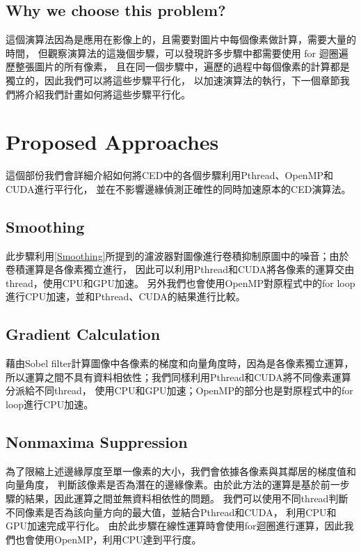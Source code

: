 \documentclass[sigconf,nonacm]{acmart}
\begin{document}
\subsection{Why we choose this problem?}

這個演算法因為是應用在影像上的，且需要對圖片中每個像素做計算，需要大量的時間，
但觀察演算法的這幾個步驟，可以發現許多步驟中都需要使用 for 迴圈遍歷整張圖片的所有像素，
且在同一個步驟中，遍歷的過程中每個像素的計算都是獨立的，因此我們可以將這些步驟平行化，
以加速演算法的執行，下一個章節我們將介紹我們計畫如何將這些步驟平行化。

\section{Proposed Approaches}

這個部份我們會詳細介紹如何將CED中的各個步驟利用Pthread、OpenMP和CUDA進行平行化，
並在不影響邊緣偵測正確性的同時加速原本的CED演算法。

\subsection{Smoothing}

此步驟利用\ref{Smoothing}所提到的濾波器對圖像進行卷積抑制原圖中的噪音；由於卷積運算是各像素獨立進行，
因此可以利用Pthread和CUDA將各像素的運算交由thread，使用CPU和GPU加速。
另外我們也會使用OpenMP對原程式中的for loop進行CPU加速，並和Pthread、CUDA的結果進行比較。

\subsection{Gradient Calculation}

藉由Sobel filter計算圖像中各像素的梯度和向量角度時，因為是各像素獨立運算，
所以運算之間不具有資料相依性；我們同樣利用Pthread和CUDA將不同像素運算分派給不同thread，
使用CPU和GPU加速；OpenMP的部分也是對原程式中的for loop進行CPU加速。

\subsection{Nonmaxima Suppression}

為了限縮上述邊緣厚度至單一像素的大小，我們會依據各像素與其鄰居的梯度值和向量角度，
判斷該像素是否為潛在的邊緣像素。由於此方法的運算是基於前一步驟的結果，因此運算之間並無資料相依性的問題。
我們可以使用不同thread判斷不同像素是否為該向量方向的最大值，並結合Pthread和CUDA，
利用CPU和GPU加速完成平行化。
由於此步驟在線性運算時會使用for迴圈進行運算，因此我們也會使用OpenMP，利用CPU達到平行度。
\end{document}
